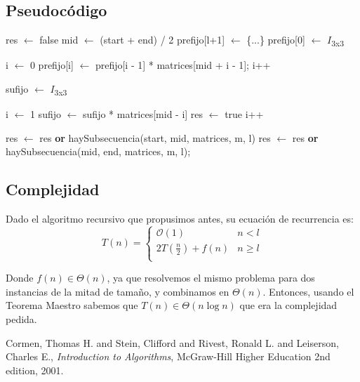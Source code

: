 \subsection{Pseudocódigo}

\begin{algorithmic}


    \State {}
  \EndIf

    \State {}
  \EndIf
    
  \State 
  
  \State res $\gets$ false
  \State mid $\gets$ (start + end) / 2
  \State prefijo[l+1] $\gets$ \{...\}
  \State prefijo[0] $\gets$ $I$\textsubscript{3x3}
  
  \State 
  
  \State i $\gets$ 0
    \State prefijo[i] $\gets$ prefijo[i - 1] * matrices[mid + i - 1];
    \State i++
  \EndWhile
  
  \State
  \State sufijo $\gets$ $I$\textsubscript{3x3}
  \State
  
  \State i $\gets$ 1
    \State sufijo $\gets$ sufijo * matrices[mid - i]
      \State res $\gets$ true
    \EndIf
    \State i++
  \EndWhile
  
  \State
  
  \State res $\gets$ res \textbf{or} haySubsecuencia(start, mid, matrices, m, l)
  \State res $\gets$ res \textbf{or} haySubsecuencia(mid, end, matrices, m, l);
  
  
\EndFunction

\end{algorithmic}


\subsection{Complejidad}
Dado el algoritmo recursivo que propusimos antes, su ecuación de recurrencia es:
\newline
 \[ T(n) =  \begin{cases} 
      \mathcal{O}(1) & n < l \\
      2 T(\frac{n}{2}) + f(n) & n \geq l \\ 
   \end{cases}
 \]

Donde $f(n) \in \Theta(n)$, ya que resolvemos el mismo problema para dos instancias de la mitad de tamaño, y combinamos
en $\Theta(n)$. Entonces, usando el Teorema Maestro\cite{cormen_algo} sabemos que
$T(n) \in \Theta(n\log{}n)$ que era la complejidad pedida.

\begin{thebibliography}{9}

  Cormen, Thomas H. and Stein, Clifford and Rivest, Ronald L. and Leiserson, Charles E.,
  \emph{Introduction to Algorithms},
  McGraw-Hill Higher Education
  2nd edition,
  2001.

\end{thebibliography}

